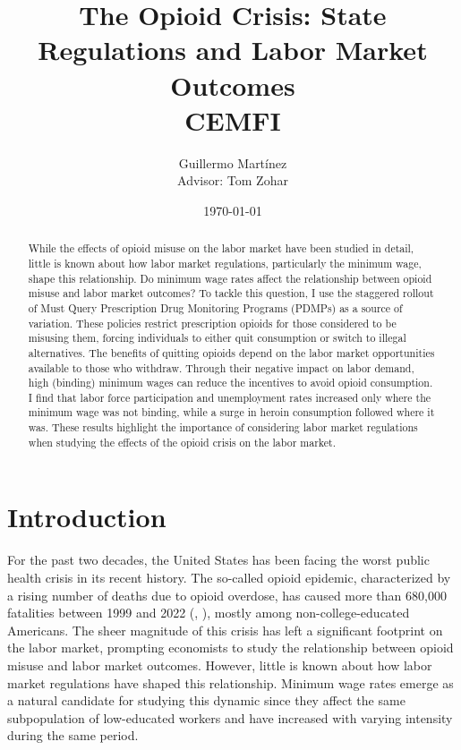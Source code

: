\documentclass[12pt,a4paper]{article}
\title{The Opioid Crisis: State Regulations and Labor Market Outcomes \\
[2ex] \large CEMFI}
\author{Guillermo Martínez \\ [2ex] Advisor: Tom Zohar}
\date{\today}
\begin{document}
\maketitle

\begin{abstract}
    \noindent
    While the effects of opioid misuse on the labor market have been studied in detail, little is known about how labor market regulations, particularly the minimum wage, shape this relationship. Do minimum wage rates affect the relationship between opioid misuse and labor market outcomes? To tackle this question, I use the staggered rollout of Must Query Prescription Drug Monitoring Programs (PDMPs) as a source of variation. These policies restrict prescription opioids for those considered to be misusing them, forcing individuals to either quit consumption or switch to illegal alternatives. The benefits of quitting opioids depend on the labor market opportunities available to those who withdraw. Through their negative impact on labor demand, high (binding) minimum wages can reduce the incentives to avoid opioid consumption. I find that labor force participation and unemployment rates increased only where the minimum wage was not binding, while a surge in heroin consumption followed where it was. These results highlight the importance of considering labor market regulations when studying the effects of the opioid crisis on the labor market.
\end{abstract}


\newpage

\section*{Introduction}

For the past two decades, the United States has been facing the worst public health crisis in its recent history.
The so-called opioid epidemic, characterized by a rising number of deaths due to opioid overdose, has caused more than 680,000 fatalities between 1999 and 2022 (\cite{CDCMCD9920}, \cite{CDCMCD1822}), mostly among non-college-educated Americans.
The sheer magnitude of this crisis has left a significant footprint on the labor market, prompting economists to study the relationship between opioid misuse and labor market outcomes.
However, little is known about how labor market regulations have shaped this relationship.
Minimum wage rates emerge as a natural candidate for studying this dynamic since they affect the same subpopulation of low-educated workers and have increased with varying intensity during the same period.
\end{document}
